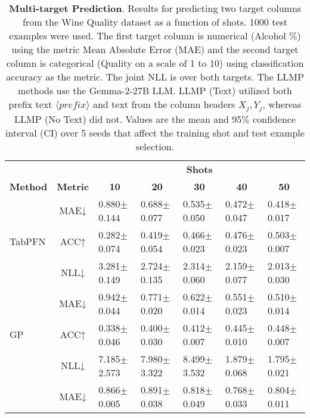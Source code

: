 \begin{table*}[htbp]
  \centering
  \caption{\textbf{Multi-target Prediction}. Results for predicting two target columns from the Wine Quality dataset \citep{wine_quality_186} as a function of shots. 1000 test examples were used. The first target column is numerical (Alcohol $\%$) using the metric Mean Absolute Error (MAE) and the second target column is categorical (Quality on a scale of 1 to 10) using classification accuracy as the metric. The joint NLL is over both targets. The LLMP methods use the Gemma-2-27B LLM. LLMP (Text) utilized both prefix text $\langle prefix \rangle$ and text from the column headers $X_j, Y_j$, whereas LLMP (No Text) did not. Values are the mean and 95$\%$ confidence interval (CI) over 5 seeds that affect the training shot and test example selection.}
  \label{tab:multi_column_results}%
  \vskip 0.1in
  \begin{small}
  \begin{sc}
  \begin{adjustbox}{max width=\textwidth}
    \begin{tabular}{rclllll}
    \toprule
          &       & \multicolumn{5}{c}{\textbf{Shots}} \\
\cmidrule{3-7}    \multicolumn{1}{l}{\textbf{Method}} & \textbf{Metric} & \multicolumn{1}{c}{\textbf{10}} & \multicolumn{1}{c}{\textbf{20}} & \multicolumn{1}{c}{\textbf{30}} & \multicolumn{1}{c}{\textbf{40}} & \multicolumn{1}{c}{\textbf{50}} \\
    \midrule
          & MAE↓  & 0.880$\pm$0.144 & 0.688$\pm$0.077 & 0.535$\pm$0.050 & 0.472$\pm$0.047 & 0.418$\pm$0.017 \\
    \multicolumn{1}{l}{TabPFN} & ACC↑  & 0.282$\pm$0.074 & 0.419$\pm$0.054 & 0.466$\pm$0.023 & 0.476$\pm$0.023 & 0.503$\pm$0.007 \\
          & NLL↓  & 3.281$\pm$0.149 & 2.724$\pm$0.135 & 2.314$\pm$0.060 & 2.159$\pm$0.077 & 2.013$\pm$0.030 \\
    \midrule
          & MAE↓  & 0.942$\pm$0.044 & 0.771$\pm$0.020 & 0.622$\pm$0.014 & 0.551$\pm$0.023 & 0.510$\pm$0.014 \\
    \multicolumn{1}{l}{GP} & ACC↑  & 0.338$\pm$0.046 & 0.400$\pm$0.030 & 0.412$\pm$0.007 & 0.445$\pm$0.010 & 0.448$\pm$0.007 \\
          & NLL↓  & 7.185$\pm$2.573 & 7.980$\pm$3.322 & 8.499$\pm$3.532 & 1.879$\pm$0.068 & 1.795$\pm$0.021 \\
    \midrule
          & MAE↓  & 0.866$\pm$0.005 & 0.891$\pm$0.038 & 0.818$\pm$0.049 & 0.768$\pm$0.033 & 0.804$\pm$0.011 \\

\end{tabular}
\end{adjustbox}
\end{sc}
\end{small}
\end{table*}
